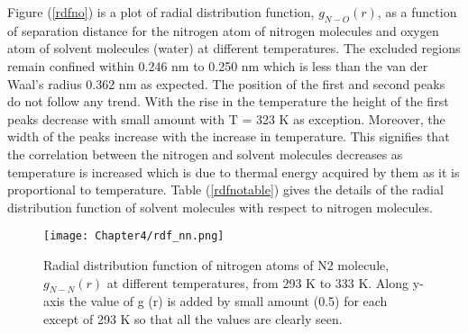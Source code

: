 Figure (\ref {rdfno}) is a plot of radial distribution function, $g_{N-O} (r)$, as a function of separation distance for the nitrogen atom of nitrogen molecules and oxygen atom of  solvent molecules (water) at different temperatures. The excluded regions remain confined within 0.246 nm to 0.250 nm which is less than the van der Waal's radius 0.362 nm as expected. The position of the first and second peaks do not follow any trend. With the rise in the temperature the height of the first peaks decrease with small amount with T = 323 K as exception. Moreover, the width of the peaks increase with
the increase in temperature. This signifies that the correlation between the nitrogen and solvent molecules decreases as temperature is increased which is due to thermal energy
acquired by them as it is proportional to temperature. Table (\ref {rdfnotable}) gives the details of the radial distribution function of solvent molecules with respect to nitrogen molecules.

\begin{table}[H]
\centering
\caption[ Details of the radial distribution function between nitrogen atom of nitrogen molecule and oxygen atom of water molecule.]
{ Details of the radial distribution function between nitrogen atom of nitrogen molecule and oxygen atom of water $g_{N-O} (r)$,   at different temperatures, from 293 K to 333 K. } 
\label{rdfnotable}
\end{table}

\begin{figure}[h!]
\centering
\texttt{[image: Chapter4/rdf\_nn.png]}
\caption[Radial distribution function  of nitrogen atoms of N2 molecule  at different temperatures.]{ Radial distribution function  of nitrogen atoms of N2 molecule, $g_{N-N} (r)$ at different temperatures, from 293 K to 333 K. Along y-axis the value of g (r) is added by small amount (0.5) for each  except of  293 K  so that all the values are clearly seen.}
\label{rdfnn}
\end{figure}

